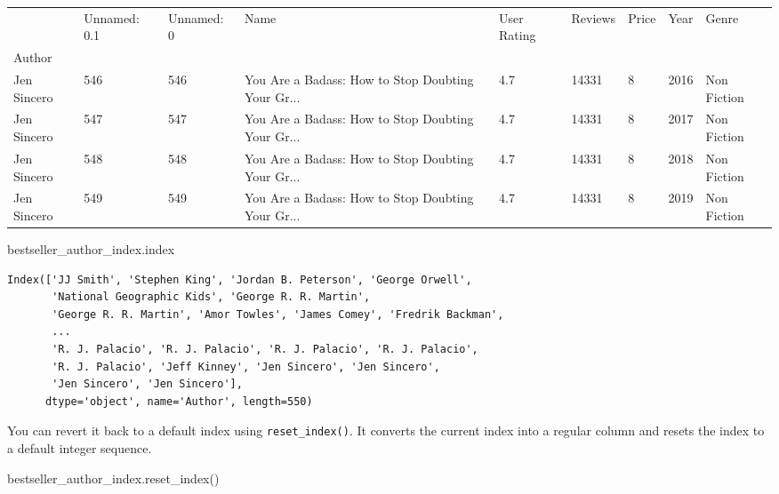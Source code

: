 \documentclass[
  letterpaper,
  DIV=11,
  numbers=noendperiod]{scrreprt}
\newenvironment{Shaded}{\begin{snugshade}}{\end{snugshade}}
\newcommand{\NormalTok}[1]{\textcolor[rgb]{0.00,0.23,0.31}{#1}}
\begin{document}
\begin{longtable}[]{@{}lllllllll@{}}
\toprule\noalign{}
& Unnamed: 0.1 & Unnamed: 0 & Name & User Rating & Reviews & Price &
Year & Genre \\
Author & & & & & & & & \\
\midrule\noalign{}
\endhead
\bottomrule\noalign{}
\endlastfoot
Jen Sincero & 546 & 546 & You Are a Badass: How to Stop Doubting Your
Gr... & 4.7 & 14331 & 8 & 2016 & Non Fiction \\
Jen Sincero & 547 & 547 & You Are a Badass: How to Stop Doubting Your
Gr... & 4.7 & 14331 & 8 & 2017 & Non Fiction \\
Jen Sincero & 548 & 548 & You Are a Badass: How to Stop Doubting Your
Gr... & 4.7 & 14331 & 8 & 2018 & Non Fiction \\
Jen Sincero & 549 & 549 & You Are a Badass: How to Stop Doubting Your
Gr... & 4.7 & 14331 & 8 & 2019 & Non Fiction \\
\end{longtable}

\begin{Shaded}
\begin{Highlighting}[]
\NormalTok{bestseller\_author\_index.index}
\end{Highlighting}
\end{Shaded}

\begin{verbatim}
Index(['JJ Smith', 'Stephen King', 'Jordan B. Peterson', 'George Orwell',
       'National Geographic Kids', 'George R. R. Martin',
       'George R. R. Martin', 'Amor Towles', 'James Comey', 'Fredrik Backman',
       ...
       'R. J. Palacio', 'R. J. Palacio', 'R. J. Palacio', 'R. J. Palacio',
       'R. J. Palacio', 'Jeff Kinney', 'Jen Sincero', 'Jen Sincero',
       'Jen Sincero', 'Jen Sincero'],
      dtype='object', name='Author', length=550)
\end{verbatim}

You can revert it back to a default index using \texttt{reset\_index()}.
It converts the current index into a regular column and resets the index
to a default integer sequence.

\begin{Shaded}
\begin{Highlighting}[]
\NormalTok{bestseller\_author\_index.reset\_index()}
\end{Highlighting}
\end{Shaded}
\end{document}
